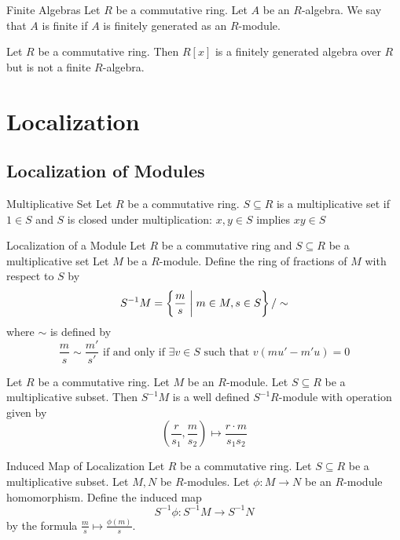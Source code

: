 \documentclass[a4paper]{article}
\begin{document}
\begin{defn}{Finite Algebras}{} Let $R$ be a commutative ring. Let $A$ be an $R$-algebra. We say that $A$ is finite if $A$ is finitely generated as an $R$-module. 
\end{defn}

\begin{eg}{}{} Let $R$ be a commutative ring. Then $R[x]$ is a finitely generated algebra over $R$ but is not a finite $R$-algebra. 
\end{eg}

\pagebreak
\section{Localization}
\subsection{Localization of Modules}
\begin{defn}{Multiplicative Set}{} Let $R$ be a commutative ring. $S\subseteq R$ is a multiplicative set if $1\in S$ and $S$ is closed under multiplication: $x,y\in S$ implies $xy\in S$
\end{defn}

\begin{defn}{Localization of a Module}{} Let $R$ be a commutative ring and $S\subseteq R$ be a multiplicative set Let $M$ be a $R$-module. Define the ring of fractions of $M$ with respect to $S$ by $$S^{-1}M=\left\{\frac{m}{s}\;\bigg{|}\;m\in M,s\in S\right\}/\sim$$ where $\sim$ is defined by $$\frac{m}{s}\sim\frac{m'}{s'}\text{ if and only if }\exists v\in S\text{ such that }v(mu'-m'u)=0$$
\end{defn}

\begin{lmm}{}{} Let $R$ be a commutative ring. Let $M$ be an $R$-module. Let $S\subseteq R$ be a multiplicative subset. Then $S^{-1}M$ is a well defined $S^{-1}R$-module with operation given by $$\left(\frac{r}{s_1},\frac{m}{s_2}\right)\mapsto\frac{r\cdot m}{s_1s_2}$$
\end{lmm}

\begin{defn}{Induced Map of Localization}{} Let $R$ be a commutative ring. Let $S\subseteq R$ be a multiplicative subset. Let $M,N$ be $R$-modules. Let $\phi:M\to N$ be an $R$-module homomorphism. Define the induced map $$S^{-1}\phi:S^{-1}M\to S^{-1}N$$ by the formula $\frac{m}{s}\mapsto\frac{\phi(m)}{s}$. 
\end{defn}
\end{document}
